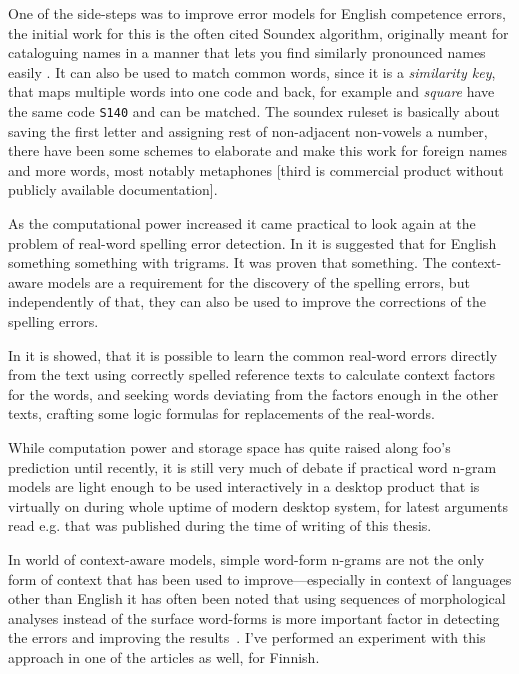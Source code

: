 \documentclass[officiallayout]{unihelcompling}
\newcommand\misspelt{\bgroup\markoverwith
{\textcolor{red}{\lower3.5pt\hbox{\sixly \char58}}}\ULon}
\begin{document}
One of the side-steps was to improve error models for English competence
errors, the initial work for this is the often cited Soundex algorithm,
originally meant for cataloguing names in a manner that lets you find similarly
pronounced names easily \citep{russell1918soundex}. It can also be used to match
common words, since it is a \emph{similarity key}, that maps multiple words
into one code and back, for example \misspelt{squer} and \emph{square} have the
same code \texttt{S140} and can be matched. The soundex ruleset is basically
about saving the first letter and assigning rest of non-adjacent non-vowels a
number, there have been some schemes to elaborate and make this work for
foreign names and more words, most notably metaphones
\citep{philips1990hanging,philips2000double}[third is commercial product without
publicly available documentation].

As the computational power increased it came practical to look again at the
problem of real-word spelling error detection. In \citep{mays1991context} it is
suggested that for English something something with trigrams. It was proven
that something. The context-aware models are a
requirement for the discovery of the spelling errors, but independently of
that, they can also be used to improve the corrections of the spelling errors. 

In \citep{al2006learning} it is showed, that it is possible to learn the common
real-word errors directly from the text using correctly spelled reference texts
to calculate context factors for the words, and seeking words deviating from
the factors enough in the other texts, crafting some logic formulas for
replacements of the real-words.

While computation power and storage space has quite raised along foo's
prediction until recently, it is still very much of debate if practical word
n-gram models are light enough to be used interactively in a desktop product
that is virtually on during whole uptime of modern desktop system, for latest
arguments read e.g. \citep{} that was published during the time of writing of
this thesis.

In world of context-aware models, simple word-form n-grams are not the only
form of context that has been used to improve---especially in context of
languages other than English it has often been noted that using sequences of
morphological analyses instead of the surface word-forms is more important
factor in detecting the errors and improving the results~\citep[for
Spanish]{otero2007contextual}. I've performed an experiment with this approach
in one of the articles as well, for Finnish.
\end{document}
